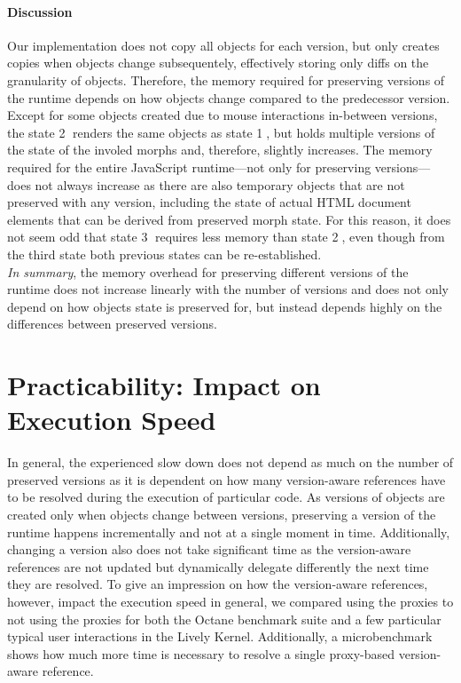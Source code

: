 \paragraph{Discussion}
Our implementation does not copy all objects for each version, but only creates copies when objects change subsequentely, effectively storing only diffs on the granularity of objects.
Therefore, the memory required for preserving versions of the runtime depends on how objects change compared to the predecessor version.
Except for some objects created due to mouse interactions in-between versions, the state \textcircled{2} renders the same objects as state \textcircled{1}, but holds multiple versions of the state of the involed morphs and, therefore, slightly increases.
The memory required for the entire JavaScript runtime---not only for preserving versions---does not always increase as there are also temporary objects that are not preserved with any version, including the state of actual HTML document elements that can be derived from preserved morph state.
For this reason, it does not seem odd that state \textcircled{3} requires less memory than state \textcircled{2}, even though from the third state both previous states can be re-established.\\
\emph{In summary}, the memory overhead for preserving different versions of the runtime does not increase linearly with the number of versions and does not only depend on how objects state is preserved for, but instead depends highly on the differences between preserved versions.



\section{Practicability: Impact on Execution Speed} \label{sec:DISCUSSION:3}


In general, the experienced slow down does not depend as much on the number of preserved versions as it is dependent on how many version-aware references have to be resolved during the execution of particular code.
As versions of objects are created only when objects change between versions, preserving a version of the runtime happens incrementally and not at a single moment in time.
Additionally, changing a version also does not take significant time as the version-aware references are not updated but dynamically delegate differently the next time they are resolved.
To give an impression on how the version-aware references, however, impact the execution speed in general, we compared using the proxies to not using the proxies for both the Octane benchmark suite and a few particular typical user interactions in the Lively Kernel.
Additionally, a microbenchmark shows how much more time is necessary to resolve a single proxy-based version-aware reference.



